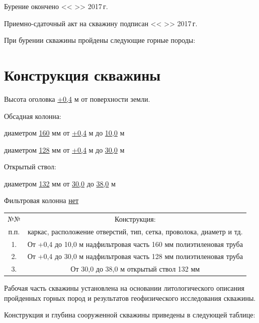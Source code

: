 \documentclass[a4paper,12pt]{article} %
\DeclareRobustCommand{\diameter}{%
	\text{\usefont{LS1}{stixscr}{m}{n}\symbol{"60}}%
}
\newcommand{\txtYear}{2017}			%
\begin{document}
	Бурение окончено << >> \txtYear \,г.

	Приемно-сдаточный акт на скважину подписан << >> \txtYear \,г.
	
	\bigskip
	
	При бурении скважины пройдены следующие горные породы:
	
	\section*{Конструкция скважины}

	Высота оголовка	\underline{+0,4} м	от поверхности земли. 
	
	\bigskip

	Обсадная колонна:

	диаметром \underline{160} мм от \underline{+0,4} м до \underline{10,0}  м  		
	
	диаметром \underline{128} мм от \underline{+0,4} м до \underline{30,0} м
	
	\bigskip

	Открытый ствол:

	 диаметром \underline{132} мм от \underline{30,0} до \underline{38,0} м 
    
    \bigskip
	
	Фильтровая колонна \underline{нет}
	
	\bigskip

\begin{tabular}{|c|c|}
	\hline 
	\rule[-1ex]{0pt}{2.5ex} №№ & Конструкция: \\ 
	\rule[-1ex]{0pt}{2.5ex} п.п. & каркас, расположение отверстий, тип, сетка, проволока, диаметр и тд. \\ 
	\hline 
	\rule[-1ex]{0pt}{2.5ex} 1. & От +0,4 до 10,0 м   надфильтровая часть \diameter 160 мм полиэтиленовая труба \\ 
	\hline 
	\rule[-1ex]{0pt}{2.5ex} 2. & От +0,4 до 30,0 м   надфильтровая часть \diameter 128 мм полиэтиленовая труба \\ 
	\hline 
	\rule[-1ex]{0pt}{2.5ex} 3. & От 30,0 до 38,0 м   открытый ствол \diameter 132 мм \\ 
	\hline 
\end{tabular} 

\bigskip

Рабочая часть скважины установлена на основании литологического описания пройденных горных пород и результатов геофизического исследования скважины.


Конструкция и глубина сооруженной скважины приведены в следующей таблице:
\end{document}
